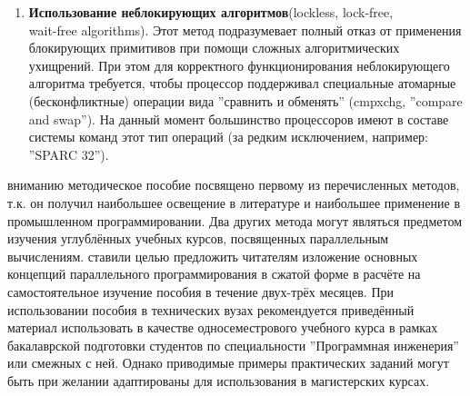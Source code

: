 {\begin{enumerate}
		\item\textbf{Использование неблокирующих алгоритмов}\quad(lockless, lock-free,\\wait-free algorithms). Этот метод подразумевает полный отказ от применения блокирующих примитивов при помощи сложных алгоритмических ухищрений. При этом для корректного функционирования неблокирующего алгоритма требуется, чтобы процессор поддерживал специальные атомарные (бесконфликтные) операции вида ''сравнить и обменять'' (cmpxchg, ''compare and swap''). На данный момент большинство процессоров имеют в составе системы команд этот тип операций (за редким исключением, например: ''SPARC 32'').
	\end{enumerate}
	 вниманию методическое пособие посвящено первому из перечисленных методов, т.к. он получил наибольшее освещение в литературе и наибольшее применение в промышленном программировании. Два других метода могут являться предметом изучения углублённых учебных курсов, посвященных параллельным вычислениям.
	 ставили целью предложить читателям изложение основных концепций параллельного программирования в сжатой форме в расчёте на самостоятельное изучение пособия в течение двух-трёх месяцев. При использовании пособия в технических вузах рекомендуется приведённый материал использовать в качестве односеместрового учебного курса в рамках бакалаврской подготовки студентов по специальности ''Программная инженерия'' или смежных с ней. Однако приводимые примеры практических заданий могут быть при желании адаптированы для использования в магистерских курсах.

}